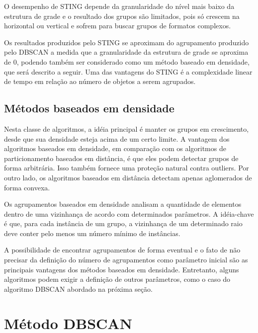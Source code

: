 O desempenho de STING depende da granularidade do nível mais baixo da estrutura de grade e o resultado dos
grupos são limitados, pois só crescem na horizontal ou vertical e sofrem para buscar grupos de formatos complexos.

Os resultados produzidos pelo STING se aproximam do agrupamento produzido pelo
DBSCAN a medida que a granularidade da estrutura de grade se aproxima de 0, podendo
também ser considerado como um método baseado em densidade, que será descrito a seguir.
Uma das vantagens do STING é a complexidade linear de tempo em relação ao número de objetos
a serem agrupados.

\subsection{Métodos baseados em densidade}
Nesta classe de algoritmos, a idéia principal é manter os grupos em crescimento, desde que sua densidade esteja acima de um certo limite. A vantagem dos algoritmos baseados em densidade, em comparação com os algoritmos de particionamento baseados em distância, é que eles podem detectar grupos de forma arbitrária. Isso também fornece uma proteção natural contra outliers. Por outro lado, os algoritmos baseados em distância detectam apenas aglomerados de forma convexa.

Os agrupamentos baseados em densidade analisam a quantidade de elementos dentro de uma vizinhança de acordo com determinados parâmetros. A idéia-chave é que, para cada instância de um grupo, a vizinhança de um determinado raio deve conter pelo menos um número mínimo de instâncias.

A possibilidade de encontrar agrupamentos de forma eventual e o fato de não precisar da definição do número de agrupamentos \cite{yip2005} como parâmetro inicial são as principais vantagens dos métodos baseados em densidade. Entretanto, alguns algoritmos podem exigir a definição de outros parâmetros, como o caso do algoritmo DBSCAN \cite{ESTER1996} abordado na próxima seção.

\section{Método DBSCAN}
\label{dbscan}

